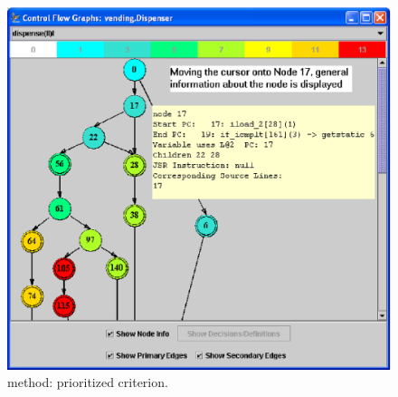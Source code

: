\begin{figure}[!ht]
\begin{center}
\includegraphics[height=0.35\textheight]{fig/dispenser-dug-edited}
\caption{\label{fig:dispenser-dug} 
method: \DUG prioritized \wrt {} criterion.}
\end{center}
\end{figure}
